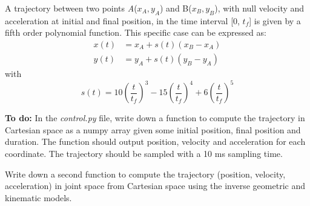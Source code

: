 \documentclass[a4paper]{article}
\begin{document}
A trajectory between two points \textit{A}($x_A, y_A$) and B($x_B, y_B$), with null velocity and acceleration at initial and final position, in the time interval [0, $t_f$] is given by a fifth order polynomial function. This specific case can be expressed as: 
\begin{align*}
x(t)&=x_A+s(t)(x_B-x_A)\\
y(t)&=y_A+s(t)(y_B-y_A)
\end{align*}
with
\begin{equation*}
s(t)=10\left(\frac{t}{t_f}\right)^3-15\left(\frac{t}{t_f}\right)^4+6\left(\frac{t}{t_f}\right)^5
\end{equation*}
%

\textbf{To do:} In the \textit{control.py} file, write down a function to compute the trajectory in Cartesian space as a numpy array given some initial position, final position and duration. The function should output position, velocity and acceleration for each coordinate. The trajectory should be sampled with a 10 ms sampling time.

Write down a second function to compute the trajectory (position, velocity, acceleration) in joint space from Cartesian space using the inverse geometric and kinematic models.
%
\end{document}
